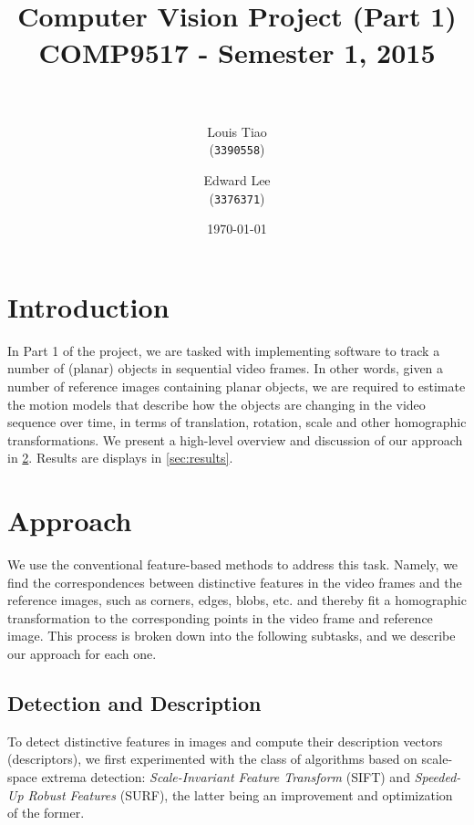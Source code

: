 \documentclass[11pt]{article} %
\title{	
\normalfont \normalsize 
\horrule{0.5pt} \\[0.4cm] %
\Large Computer Vision Project (Part 1) \\ [0.1cm] %
\large COMP9517 - Semester 1, 2015 \\ [0.2cm]
\horrule{2pt} \\[0.5cm] %
}
\author{
	Louis Tiao \\
	(\texttt{3390558})
	\and
	Edward Lee\\
	(\texttt{3376371})
} %
\date{\normalsize\today} %
\theoremstyle{plain}
\theoremstyle{definition}
\theoremstyle{remark}
\numberwithin{equation}{section} %
\numberwithin{figure}{section} %
\numberwithin{table}{section} %
\begin{document}
\maketitle %



\section{Introduction}

In Part 1 of the project, we are tasked with implementing software to track a number 
of (planar) objects in sequential video frames. In other words, given a number of 
reference images containing planar objects, we are required to estimate the motion 
models that describe how the objects are changing in the video sequence over time, 
in terms of translation, rotation, scale and other homographic transformations. We 
present a high-level overview and discussion of our approach in \cref{sec:approach}. Results are displays in \cref{sec:results}.

\section{Approach} \label{sec:approach}

We use the conventional feature-based methods to address this task. Namely, we find
the correspondences between distinctive features in the video frames and the reference 
images, such as corners, edges, blobs, etc. and thereby fit a homographic transformation 
to the corresponding points in the video frame and reference image. This process is
broken down into the following subtasks, and we describe our approach for each one.

\subsection{Detection and Description}


To detect distinctive features in images and compute their description vectors 
(descriptors), we first experimented with the class of algorithms based on scale-space 
extrema detection: \emph{Scale-Invariant Feature Transform} \citep{Lowe2004} (SIFT) and 
\emph{Speeded-Up Robust Features} \citep{Bay2008} (SURF), the latter being an improvement 
and optimization 
of the former. 
\end{document}
